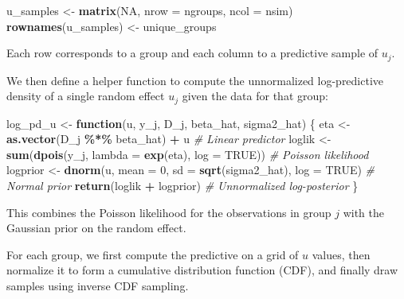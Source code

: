 \documentclass[
  letterpaper,
]{krantz}
\newenvironment{Shaded}{\begin{snugshade}}{\end{snugshade}}
\newcommand{\AttributeTok}[1]{\textcolor[rgb]{0.13,0.29,0.53}{#1}}
\newcommand{\CommentTok}[1]{\textcolor[rgb]{0.56,0.35,0.01}{\textit{#1}}}
\newcommand{\ConstantTok}[1]{\textcolor[rgb]{0.56,0.35,0.01}{#1}}
\newcommand{\ControlFlowTok}[1]{\textcolor[rgb]{0.13,0.29,0.53}{\textbf{#1}}}
\newcommand{\DecValTok}[1]{\textcolor[rgb]{0.00,0.00,0.81}{#1}}
\newcommand{\FunctionTok}[1]{\textcolor[rgb]{0.13,0.29,0.53}{\textbf{#1}}}
\newcommand{\NormalTok}[1]{#1}
\newcommand{\OtherTok}[1]{\textcolor[rgb]{0.56,0.35,0.01}{#1}}
\newcommand{\SpecialCharTok}[1]{\textcolor[rgb]{0.81,0.36,0.00}{\textbf{#1}}}
\begin{document}
\begin{Shaded}
\begin{Highlighting}[]
\NormalTok{u\_samples }\OtherTok{\textless{}{-}} \FunctionTok{matrix}\NormalTok{(}\ConstantTok{NA}\NormalTok{, }\AttributeTok{nrow =}\NormalTok{ ngroups, }\AttributeTok{ncol =}\NormalTok{ nsim)}
\FunctionTok{rownames}\NormalTok{(u\_samples) }\OtherTok{\textless{}{-}}\NormalTok{ unique\_groups}
\end{Highlighting}
\end{Shaded}

Each row corresponds to a group and each column to a predictive sample
of \(u_j\).

We then define a helper function to compute the unnormalized
log-predictive density of a single random effect \(u_j\) given the data
for that group:

\begin{Shaded}
\begin{Highlighting}[]
\NormalTok{log\_pd\_u }\OtherTok{\textless{}{-}} \ControlFlowTok{function}\NormalTok{(u, y\_j, D\_j, beta\_hat, sigma2\_hat) \{}
\NormalTok{  eta }\OtherTok{\textless{}{-}} \FunctionTok{as.vector}\NormalTok{(D\_j }\SpecialCharTok{\%*\%}\NormalTok{ beta\_hat) }\SpecialCharTok{+}\NormalTok{ u      }\CommentTok{\# Linear predictor}
\NormalTok{  loglik }\OtherTok{\textless{}{-}} \FunctionTok{sum}\NormalTok{(}\FunctionTok{dpois}\NormalTok{(y\_j, }\AttributeTok{lambda =} \FunctionTok{exp}\NormalTok{(eta), }\AttributeTok{log =} \ConstantTok{TRUE}\NormalTok{))   }\CommentTok{\# Poisson likelihood}
\NormalTok{  logprior }\OtherTok{\textless{}{-}} \FunctionTok{dnorm}\NormalTok{(u, }\AttributeTok{mean =} \DecValTok{0}\NormalTok{, }\AttributeTok{sd =} \FunctionTok{sqrt}\NormalTok{(sigma2\_hat), }\AttributeTok{log =} \ConstantTok{TRUE}\NormalTok{) }\CommentTok{\# Normal prior}
  \FunctionTok{return}\NormalTok{(loglik }\SpecialCharTok{+}\NormalTok{ logprior)                   }\CommentTok{\# Unnormalized log{-}posterior}
\NormalTok{\}}
\end{Highlighting}
\end{Shaded}

This combines the Poisson likelihood for the observations in group \(j\)
with the Gaussian prior on the random effect.

For each group, we first compute the predictive on a grid of \(u\)
values, then normalize it to form a cumulative distribution function
(CDF), and finally draw samples using inverse CDF sampling.
\end{document}
